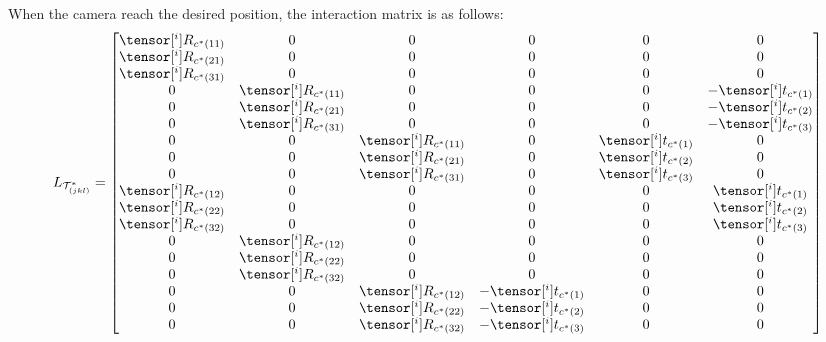 When the camera reach the desired position, the interaction matrix is as follows:
\begin{equation}
\begin{gathered}
  L_{\mathcal{T}^{*}_{(jkl)}} = %
  \begin{bmatrix}
      \tensor[^{i}]{R}{_{c^*(11)}} & 0 & 0 & 0 & 0 &0\\
      \tensor[^{i}]{R}{_{c^*(21)}} & 0 & 0 & 0 & 0 &0\\
      \tensor[^{i}]{R}{_{c^*(31)}} & 0 & 0 & 0 & 0 &0\\

      0 & \tensor[^{i}]{R}{_{c^*(11)}} & 0 & 0 & 0 & - \tensor[^{i}]{t}{_{c^*(1)}}\\
      0 & \tensor[^{i}]{R}{_{c^*(21)}} & 0 & 0 & 0 & - \tensor[^{i}]{t}{_{c^*(2)}}\\
      0 & \tensor[^{i}]{R}{_{c^*(31)}} & 0 & 0 & 0 & - \tensor[^{i}]{t}{_{c^*(3)}}\\

      0 & 0 & \tensor[^{i}]{R}{_{c^*(11)}} & 0 & \tensor[^{i}]{t}{_{c^*(1)}} & 0 \\
      0 & 0 & \tensor[^{i}]{R}{_{c^*(21)}} & 0 & \tensor[^{i}]{t}{_{c^*(2)}} & 0 \\
      0 & 0 & \tensor[^{i}]{R}{_{c^*(31)}} & 0 & \tensor[^{i}]{t}{_{c^*(3)}} & 0 \\


      \tensor[^{i}]{R}{_{c^*(12)}} & 0 & 0 & 0 & 0 & \tensor[^{i}]{t}{_{c^*(1)}}\\
      \tensor[^{i}]{R}{_{c^*(22)}} & 0 & 0 & 0 & 0 & \tensor[^{i}]{t}{_{c^*(2)}}\\
      \tensor[^{i}]{R}{_{c^*(32)}} & 0 & 0 & 0 & 0 & \tensor[^{i}]{t}{_{c^*(3)}}\\

      0 & \tensor[^{i}]{R}{_{c^*(12)}} & 0 & 0 & 0 & 0\\
      0 & \tensor[^{i}]{R}{_{c^*(22)}} & 0 & 0 & 0 & 0\\
      0 & \tensor[^{i}]{R}{_{c^*(32)}} & 0 & 0 & 0 & 0\\

      0 & 0 & \tensor[^{i}]{R}{_{c^*(12)}} & - \tensor[^{i}]{t}{_{c^*(1)}} & 0 & 0 \\
      0 & 0 & \tensor[^{i}]{R}{_{c^*(22)}} & - \tensor[^{i}]{t}{_{c^*(2)}} & 0 & 0 \\
      0 & 0 & \tensor[^{i}]{R}{_{c^*(32)}} & - \tensor[^{i}]{t}{_{c^*(3)}} & 0 & 0 \\



\end{bmatrix}
\end{gathered}
\end{equation}
